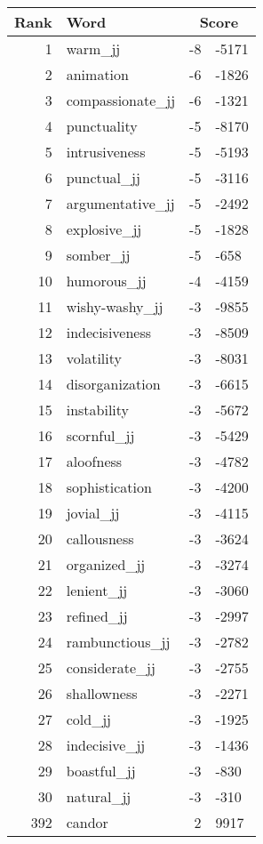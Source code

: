 \begin{longtable}[!htbp]{| rlr@{.}l |}
    \hline
    \textbf{Rank} & \textbf{Word} & \multicolumn{2}{c|}{\textbf{Score}} \\
    \hline
    \endhead
    1 & warm\_jj & -8 & -5171 \\
    2 & animation & -6 & -1826 \\
    3 & compassionate\_jj & -6 & -1321 \\
    4 & punctuality & -5 & -8170 \\
    5 & intrusiveness & -5 & -5193 \\
    6 & punctual\_jj & -5 & -3116 \\
    7 & argumentative\_jj & -5 & -2492 \\
    8 & explosive\_jj & -5 & -1828 \\
    9 & somber\_jj & -5 & -658 \\
    10 & humorous\_jj & -4 & -4159 \\
    11 & wishy-washy\_jj & -3 & -9855 \\
    12 & indecisiveness & -3 & -8509 \\
    13 & volatility & -3 & -8031 \\
    14 & disorganization & -3 & -6615 \\
    15 & instability & -3 & -5672 \\
    16 & scornful\_jj & -3 & -5429 \\
    17 & aloofness & -3 & -4782 \\
    18 & sophistication & -3 & -4200 \\
    19 & jovial\_jj & -3 & -4115 \\
    20 & callousness & -3 & -3624 \\
    21 & organized\_jj & -3 & -3274 \\
    22 & lenient\_jj & -3 & -3060 \\
    23 & refined\_jj & -3 & -2997 \\
    24 & rambunctious\_jj & -3 & -2782 \\
    25 & considerate\_jj & -3 & -2755 \\
    26 & shallowness & -3 & -2271 \\
    27 & cold\_jj & -3 & -1925 \\
    28 & indecisive\_jj & -3 & -1436 \\
    29 & boastful\_jj & -3 & -830 \\
    30 & natural\_jj & -3 & -310 \\
    392 & candor & 2 & 9917 \\

\end{longtable}
